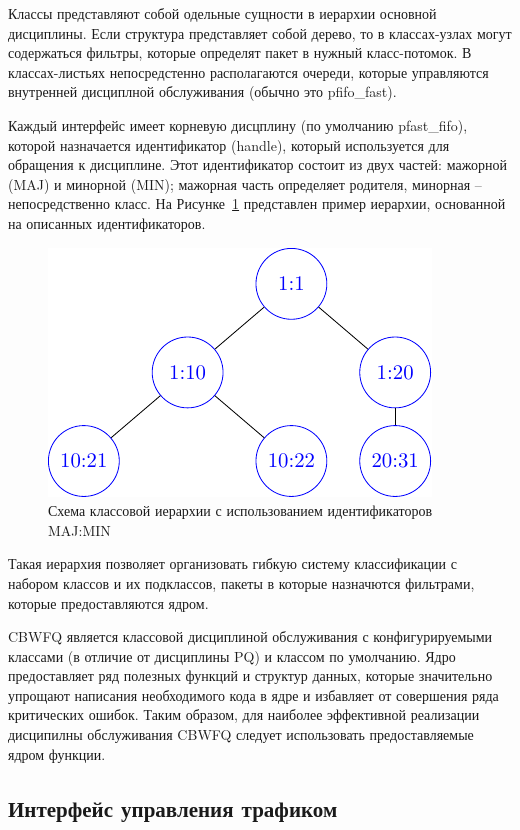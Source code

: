 	Классы представляют собой одельные сущности в иерархии основной дисциплины.
	Если структура представляет собой дерево, то в классах-узлах могут содержаться
	фильтры, которые определят пакет в нужный класс-потомок. В классах-листьях
	непосредстенно располагаются очереди, которые управляются внутренней дисциплной
	обслуживания (обычно это pfifo\_fast). 

	Каждый интерфейс имеет корневую дисцплину (по умолчанию pfast\_fifo), которой
	назначается идентификатор (handle), который используется для обращения к дисциплине.
	Этот идентификатор состоит из двух частей: мажорной (MAJ) и минорной (MIN); мажорная
	часть определяет родителя, минорная -- непосредственно класс. На Рисунке~\ref{pic:clheirh}
	представлен пример иерархии, основанной на описанных идентификаторов.

	\begin{figure}[ht!]
		\centering
		\includegraphics{./pdfimages/class_hierh.pdf}
		\caption{Схема классовой иерархии с использованием идентификаторов MAJ:MIN}
		\label{pic:clheirh}
	\end{figure}

	Такая иерархия позволяет организовать гибкую систему классификации с набором классов
	и их подклассов, пакеты в которые назначются фильтрами, которые предоставляются ядром.

	CBWFQ является классовой дисциплиной обслуживания с конфигурируемыми классами (в отличие от
	дисциплины PQ) и классом по умолчанию. Ядро предоставляет ряд полезных функций и структур
	данных, которые значительно упрощают написания необходимого кода в ядре и избавляет от
	совершения ряда критических ошибок. Таким образом, для наиболее эффективной реализации
	дисципилны обслуживания CBWFQ следует использовать предоставляемые ядром функции.

	\subsection{Интерфейс управления трафиком}

